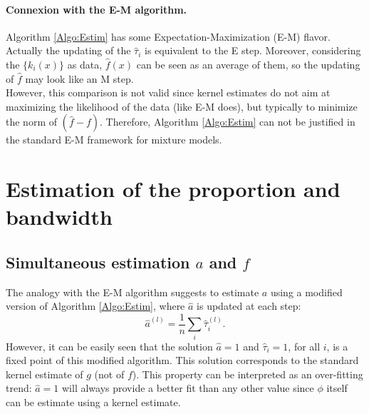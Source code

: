 \documentclass[10pt]{article}
\begin{document}
\paragraph{Connexion with the E-M algorithm.}
Algorithm \ref{Algo:Estim} has some Expectation-Maxi\-mi\-za\-tion
(E-M) flavor.  Actually the updating of the $\widehat{\tau}_i$ is
equivalent to the E step. Moreover, considering the $\{k_i(x)\}$ as
data, $\widehat{f}(x)$ can be seen as an average of them, so the
updating of $\widehat{f}$ may look like an M step.  \\
However, this comparison is not valid since kernel estimates do not
aim at maximizing the likelihood of the data (like E-M does), but
typically to minimize the norm of $(\widehat{f} - f)$.  Therefore,
Algorithm \ref{Algo:Estim} can not be justified in the standard E-M
framework for mixture models.

\section{Estimation of the proportion and bandwidth}

\subsection{Simultaneous estimation $a$ and $f$}
The analogy with the E-M algorithm suggests to estimate $a$ using a
modified version of Algorithm \ref{Algo:Estim}, where
$\widehat{a}$ is updated at each step:
$$
\widehat{a}^{(l)} = \frac1n \sum_i \widehat{\tau}_i^{(l)}.
$$
However, it can be easily seen that the solution $\widehat{a} = 1$ and $\widehat{\tau}_i = 1$, for all $i$, is a fixed point of this modified algorithm. This
solution corresponds to the standard kernel estimate of $g$ (not of $f$). This property can be interpreted as an over-fitting trend: $\widehat{a}=1$ will
always provide a better fit than any other value since $\phi$ itself can be estimate using a kernel estimate.

\end{document}
